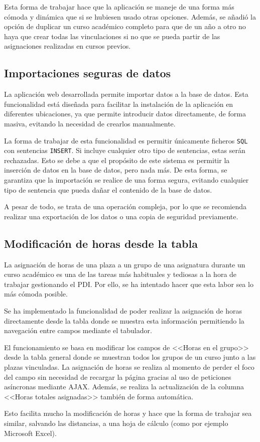 Esta forma de trabajar hace que la aplicación se maneje de una forma más cómoda y dinámica que si se hubiesen usado otras opciones.
Además, se añadió la opción de duplicar un curso académico completo para que de un año a otro no haya que crear todas las vinculaciones si no que se pueda partir de las asignaciones realizadas en cursos previos.

\subsection{Importaciones seguras de datos}
La aplicación web desarrollada permite importar datos a la base de datos.
Esta funcionalidad está diseñada para facilitar la instalación de la aplicación en diferentes ubicaciones, ya que permite introducir datos directamente, de forma masiva, evitando la necesidad de crearlos manualmente.

La forma de trabajar de esta funcionalidad es permitir únicamente ficheros \texttt{SQL} con sentencias \texttt{INSERT}. 
Si incluye cualquier otro tipo de sentencias, estas serán rechazadas.
Esto se debe a que el propósito de este sistema es permitir la inserción de datos en la base de datos, pero nada más.
De esta forma, se garantiza que la importación se realice de una forma segura, evitando cualquier tipo de sentencia que pueda dañar el contenido de la base de datos.

A pesar de todo, se trata de una operación compleja, por lo que se recomienda realizar una exportación de los datos o una copia de seguridad previamente.

\subsection{Modificación de horas desde la tabla}
La asignación de horas de una plaza a un grupo de una asignatura durante un curso académico es una de las tareas más habituales y tediosas a la hora de trabajar gestionando el PDI. 
Por ello, se ha intentado hacer que esta labor sea lo más cómoda posible.

Se ha implementado la funcionalidad de poder realizar la asignación de horas directamente desde la tabla donde se muestra esta información permitiendo la navegación entre campos mediante el tabulador.

El funcionamiento se basa en modificar los campos de <<Horas en el grupo>> desde la tabla general donde se muestran todos los grupos de un curso junto a las plazas vinculadas. 
La asignación de horas se realiza al momento de perder el foco del campo sin necesidad de recargar la página gracias al uso de peticiones asíncronas mediante AJAX.
Además, se realiza la actualización de la columna <<Horas totales asignadas>> también de forma automática.

Esto facilita mucho la modificación de horas y hace que la forma de trabajar sea similar, salvando las distancias, a una hoja de cálculo (como por ejemplo Microsoft Excel).

